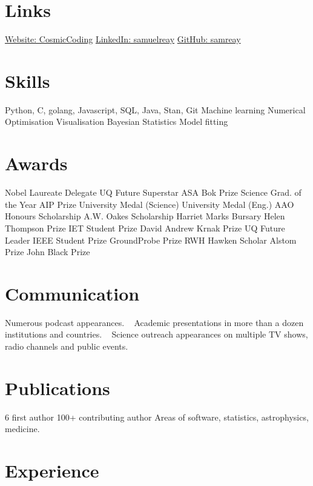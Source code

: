 \documentclass[]{friggeri-cv2}
\begin{document}
\pagestyle{plain}



\begin{aside}
\section{Links}
\href{https://cosmiccoding.com.au}{Website: CosmicCoding}
\href{https://www.linkedin.com/in/samuelreay/}{LinkedIn: samuelreay}
\href{https://github.com/samreay}{GitHub: samreay}
\section{Skills}
Python, C, golang, Javascript, SQL, Java, Stan, Git
Machine learning
Numerical Optimisation
Visualisation
Bayesian Statistics
Model fitting
\section{Awards}
Nobel Laureate Delegate
UQ Future Superstar
ASA Bok Prize
Science Grad. of the Year
AIP Prize
University Medal (Science)
University Medal (Eng.)
AAO Honours Scholarship
A.W. Oakes Scholarship
Harriet Marks Bursary
Helen Thompson Prize
IET Student Prize
David Andrew Krnak Prize
UQ Future Leader
IEEE Student Prize
GroundProbe Prize
RWH Hawken Scholar
Alstom Prize
John Black Prize
\section{Communication}
Numerous podcast appearances.
~
Academic presentations in more than a dozen institutions and countries.
~
Science outreach appearances on multiple TV shows, radio channels and public events.
\section{Publications}
6 first author
100+ contributing author
Areas of software, statistics, astrophysics, medicine.
\end{aside}


\section{Experience}
\end{document}
